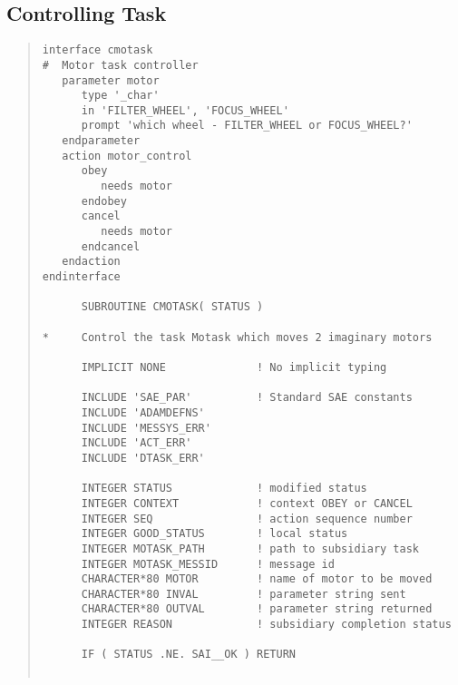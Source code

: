 \subsection{Controlling Task}
\small \begin{quote} \begin{verbatim}
interface cmotask
#  Motor task controller
   parameter motor
      type '_char'
      in 'FILTER_WHEEL', 'FOCUS_WHEEL'
      prompt 'which wheel - FILTER_WHEEL or FOCUS_WHEEL?'
   endparameter
   action motor_control
      obey
         needs motor
      endobey
      cancel
         needs motor
      endcancel
   endaction
endinterface

      SUBROUTINE CMOTASK( STATUS )

*     Control the task Motask which moves 2 imaginary motors

      IMPLICIT NONE              ! No implicit typing

      INCLUDE 'SAE_PAR'          ! Standard SAE constants
      INCLUDE 'ADAMDEFNS'
      INCLUDE 'MESSYS_ERR'
      INCLUDE 'ACT_ERR'  
      INCLUDE 'DTASK_ERR'

      INTEGER STATUS             ! modified status
      INTEGER CONTEXT            ! context OBEY or CANCEL
      INTEGER SEQ                ! action sequence number
      INTEGER GOOD_STATUS        ! local status
      INTEGER MOTASK_PATH        ! path to subsidiary task
      INTEGER MOTASK_MESSID      ! message id
      CHARACTER*80 MOTOR         ! name of motor to be moved
      CHARACTER*80 INVAL         ! parameter string sent
      CHARACTER*80 OUTVAL        ! parameter string returned
      INTEGER REASON             ! subsidiary completion status

      IF ( STATUS .NE. SAI__OK ) RETURN


\end{verbatim}
\end{quote}
